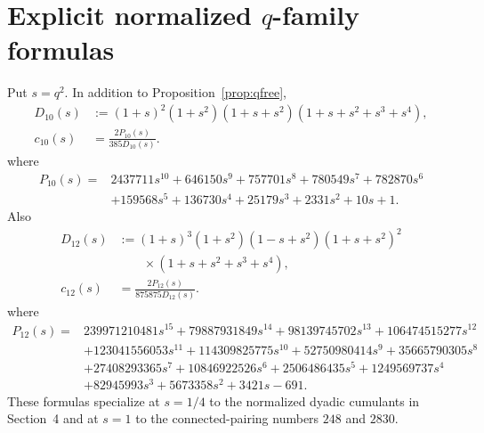 \documentclass[11pt]{article}
\theoremstyle{definition}
\begin{document}
\appendix
\section{Explicit normalized \texorpdfstring{\(q\)}{q}-family formulas}\label{app:qformulas}
Put \(s=q^2\). In addition to Proposition~\ref{prop:qfree},
\begin{align}
D_{10}(s)&:=(1+s)^2(1+s^2)(1+s+s^2)(1+s+s^2+s^3+s^4),\nonumber\\
c_{10}(s)&=\frac{2P_{10}(s)}{385D_{10}(s)}.\label{eq:c10full}
\end{align}
where
\begin{align*}
P_{10}(s)={}&2437711s^{10}+646150s^9+757701s^8+780549s^7+782870s^6\\
&+159568s^5+136730s^4+25179s^3+2331s^2+10s+1.
\end{align*}
Also
\begin{align}
D_{12}(s)&:=(1+s)^3(1+s^2)(1-s+s^2)(1+s+s^2)^2\nonumber\\
&\qquad\times(1+s+s^2+s^3+s^4),\nonumber\\
c_{12}(s)&=\frac{2P_{12}(s)}{875875D_{12}(s)}.\label{eq:c12full}
\end{align}
where
\begin{align*}
P_{12}(s)={}&239971210481s^{15}+79887931849s^{14}+98139745702s^{13}
+106474515277s^{12}\\
&+123041556053s^{11}+114309825775s^{10}+52750980414s^9
+35665790305s^8\\
&+27408293365s^7+10846922526s^6+2506486435s^5
+1249569737s^4\\
&+82945993s^3+5673358s^2+3421s-691.
\end{align*}
These formulas specialize at \(s=1/4\) to the normalized dyadic cumulants in Section~4 and at \(s=1\) to the connected-pairing numbers \(248\) and \(2830\).
\end{document}
